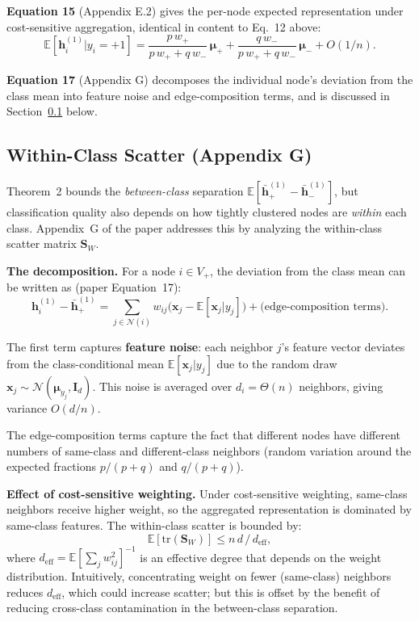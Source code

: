 \documentclass[11pt,a4paper]{article}
\newcommand{\N}{\mathcal{N}}
\newcommand{\E}{\mathbb{E}}
\newcommand{\bx}{\mathbf{x}}
\newcommand{\bh}{\mathbf{h}}
\theoremstyle{definition}
\theoremstyle{plain}
\begin{document}
\textbf{Equation 15} (Appendix E.2) gives the per-node expected representation
under cost-sensitive aggregation, identical in content to Eq.~12 above:
\begin{equation}
  \E[\bh_i^{(1)} | y_i = +1]
  = \frac{p\, w_+}{p\, w_+ + q\, w_-}\,\boldsymbol{\mu}_+
  + \frac{q\, w_-}{p\, w_+ + q\, w_-}\,\boldsymbol{\mu}_-
  + O(1/n).
  \tag{Eq.~15}
\end{equation}

\textbf{Equation 17} (Appendix G) decomposes the individual node's deviation
from the class mean into feature noise and edge-composition terms, and is
discussed in Section~\ref{sec:within_class_scatter} below.


\subsection{Within-Class Scatter (Appendix G)}
\label{sec:within_class_scatter}

Theorem~2 bounds the \emph{between-class} separation
$\E[\bar{\bh}_+^{(1)} - \bar{\bh}_-^{(1)}]$, but classification quality also
depends on how tightly clustered nodes are \emph{within} each class.
Appendix~G of the paper addresses this by analyzing the within-class scatter
matrix $\mathbf{S}_W$.

\textbf{The decomposition.}
For a node $i \in V_+$, the deviation from the class mean can be written as
(paper Equation~17):
\begin{equation}
  \bh_i^{(1)} - \bar{\bh}_+^{(1)}
  = \sum_{j \in \N(i)} w_{ij}\bigl(\bx_j - \E[\bx_j | y_j]\bigr)
  + \text{(edge-composition terms)}.
  \tag{Eq.~17}
\end{equation}

The first term captures \textbf{feature noise}: each neighbor $j$'s feature
vector deviates from the class-conditional mean $\E[\bx_j | y_j]$ due to the
random draw $\bx_j \sim \mathcal{N}(\boldsymbol{\mu}_{y_j}, \mathbf{I}_d)$.
This noise is averaged over $d_i = \Theta(n)$ neighbors, giving variance
$O(d/n)$.

The edge-composition terms capture the fact that different nodes have
different numbers of same-class and different-class neighbors
(random variation around the expected fractions $p/(p+q)$ and $q/(p+q)$).

\textbf{Effect of cost-sensitive weighting.}
Under cost-sensitive weighting, same-class neighbors receive higher weight,
so the aggregated representation is dominated by same-class features.
The within-class scatter is bounded by:
\[
  \E[\mathrm{tr}(\mathbf{S}_W)] \leq n\,d\,/\,d_{\mathrm{eff}},
\]
where $d_{\mathrm{eff}} = \E[\sum_j w_{ij}^2]^{-1}$ is an effective degree
that depends on the weight distribution.
Intuitively, concentrating weight on fewer (same-class) neighbors reduces
$d_{\mathrm{eff}}$, which could increase scatter; but this is offset by the
benefit of reducing cross-class contamination in the between-class separation.
\end{document}
